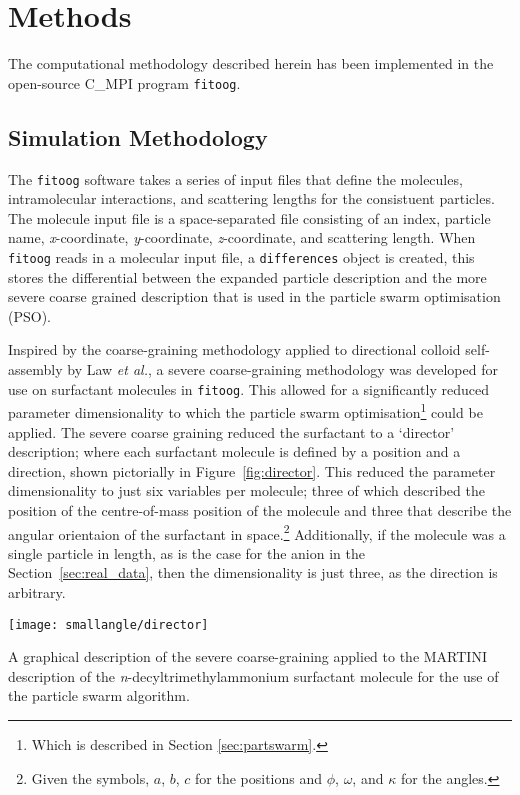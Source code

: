 \section{Methods}

The computational methodology described herein has been implemented in the open-source C\_MPI program \texttt{fitoog}.\autocite{mccluskey_arm61/fitoog_2019}

\subsection{Simulation Methodology}

The \texttt{fitoog} software takes a series of input files that define the molecules, intramolecular interactions, and scattering lengths for the consistuent particles.
The molecule input file is a space-separated file consisting of an index, particle name, \emph{x}-coordinate, \emph{y}-coordinate, \emph{z}-coordinate, and scattering length.
When \texttt{fitoog} reads in a molecular input file, a \texttt{differences} object is created, this stores the differential between the expanded particle description and the more severe coarse grained description that is used in the particle swarm optimisation (PSO).

Inspired by the coarse-graining methodology applied to directional colloid self-assembly by Law \emph{et al.},\autocite{law_coarse-grained_2016} a severe coarse-graining methodology was developed for use on surfactant molecules in \texttt{fitoog}.
This allowed for a significantly reduced parameter dimensionality to which the particle swarm optimisation\footnote{Which is described in Section \ref{sec:partswarm}.} could be applied.
The severe coarse graining reduced the surfactant to a `director' description; where each surfactant molecule is defined by a position and a direction, shown pictorially in Figure~\ref{fig:director}.
This reduced the parameter dimensionality to just six variables per molecule; three of which described the position of the centre-of-mass position of the molecule and three that describe the angular orientaion of the surfactant in space.\footnote{Given the symbols, $a$, $b$, $c$ for the positions and $\phi$, $\omega$, and $\kappa$ for the angles.}
Additionally, if the molecule was a single particle in length, as is the case for the  anion in the Section~\ref{sec:real_data}, then the dimensionality is just three, as the direction is arbitrary.
%
\begin{marginfigure}
    \centering
    \texttt{[image: smallangle/director]}
    \caption{A graphical description of the severe coarse-graining applied to the MARTINI description of the \emph{n}-decyltrimethylammonium surfactant molecule for the use of the particle swarm algorithm.}
    \label{fig:director}
\end{marginfigure}
%

